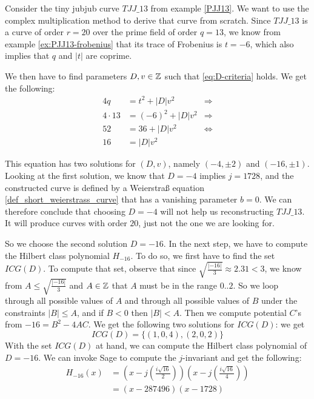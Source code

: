 \begin{example} Consider the tiny jubjub curve $\mathit{TJJ\_13}$ from example \ref{PJJ13}. We want to use the complex multiplication method to derive that curve from scratch. Since $\mathit{TJJ\_13}$ is a curve of order $r=20$ over the prime field of order $q=13$, we know from example \ref{ex:PJJ13-frobenius} that its trace of Frobenius is $t=-6$, which also implies that $q$ and $|t|$ are coprime. 

We then have to find parameters $D,v\in\mathbb{Z}$ such that \ref{eq:D-criteria} holds. We get the following:
\begin{align*}
4q & = t^2+ |D|v^2 & \Rightarrow \\
4\cdot 13 & = (-6)^2+ |D|v^2 & \Rightarrow \\
52 & = 36 + |D|v^2 & \Leftrightarrow \\
16 & = |D|v^2
\end{align*}

This equation has two solutions for $(D,v)$, namely $(-4,\pm 2)$ and $(-16,\pm 1)$. Looking at the first solution, we know that  $D=-4$ implies $j=1728$, and the constructed curve is defined by a Weierstraß equation \ref{def_short_weierstrass_curve} that has a vanishing parameter $b=0$. We can therefore conclude that choosing $D=-4$ will not help us reconstructing $\mathit{TJJ\_13}$. It will produce curves with order $20$, just not the one we are looking for.

So we choose the second solution $D=-16$. In the next step, we have to compute the Hilbert class polynomial $H_{-16}$. To do so, we first have to find the set $ICG(D)$. To compute that set, observe that since $\sqrt{\frac{|-16|}{3}}\approx 2.31<3$, we know from $A\leq \sqrt{\frac{|-16|}{3}}$ and $A\in\mathbb{Z}$ that $A$ must be in the range $0..2$. So we loop through all possible values of $A$ and through all possible values of $B$ under the constraints $|B|\leq A$, and if $B<0$ then $|B|<A$.
Then we compute potential $C$'s from $-16 = B^2 -4AC$. We get the following two solutions for $ICG(D)$:
we get
$$
ICG(D)=\{(1,0,4),(2,0,2)\}
$$
With the set $ICG(D)$ at hand, we can compute the Hilbert class polynomial of $D=-16$. We can invoke Sage to compute the $j$-invariant and get the following:
\begin{align*}
H_{-16}(x) &= \left(x - j\left(\frac{i\sqrt{16}}{2}\right)\right)
 \left(x - j\left(\frac{i\sqrt{16}}{4}\right)\right) \\
           &= (x- 287496)(x-1728)
\end{align*}


\end{example}

